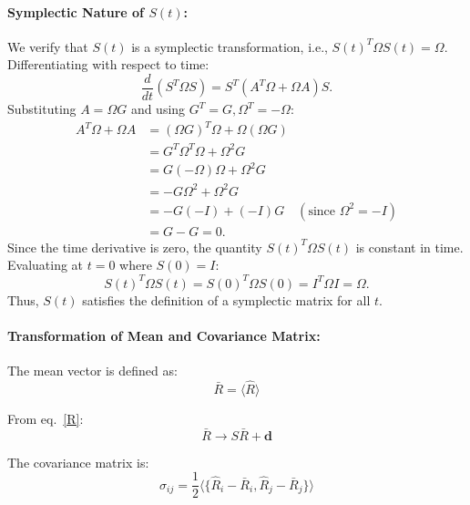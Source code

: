 \paragraph{Symplectic Nature of $S(t)$:}
We verify that $S(t)$ is a symplectic transformation, i.e., $S(t)^T \Omega S(t) = \Omega$. Differentiating with respect to time:
\begin{equation}
\frac{d}{dt} \left( S^T \Omega S \right) = S^T \left( A^T \Omega + \Omega A \right) S.
\end{equation}
Substituting $A = \Omega G$ and using $G^T=G, \Omega^T=-\Omega$:
\begin{align}
A^T \Omega + \Omega A &= (\Omega G)^T \Omega + \Omega (\Omega G) \nonumber \\
&= G^T \Omega^T \Omega + \Omega^2 G \nonumber \\
&= G (-\Omega) \Omega + \Omega^2 G \nonumber \\
&= -G \Omega^2 + \Omega^2 G \nonumber \\
&= -G (-I) + (-I) G \quad (\text{since } \Omega^2 = -I) \nonumber \\
&= G - G = 0.
\end{align}
Since the time derivative is zero, the quantity $S(t)^T \Omega S(t)$ is constant in time. Evaluating at $t=0$ where $S(0) = I$:
\begin{equation*}
S(t)^T \Omega S(t) = S(0)^T \Omega S(0) = I^T \Omega I = \Omega.
\end{equation*}
Thus, $S(t)$ satisfies the definition of a symplectic matrix for all $t$.







\vspace{0.5em}

\paragraph{Transformation of Mean and Covariance Matrix:}

The mean vector is defined as:
\begin{equation}
\bar{R} = \langle \hat{R} \rangle
\end{equation}

From eq.~\eqref{R}:
\begin{equation}
\bar{R} \rightarrow S \bar{R} + \mathbf{d}
\end{equation}

The covariance matrix is:
\begin{equation}
\sigma_{ij} = \frac{1}{2} \langle \{ \hat{R}_i - \bar{R}_i, \hat{R}_j - \bar{R}_j \} \rangle
\end{equation}


